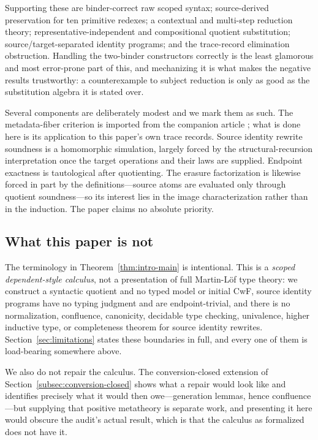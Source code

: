 \documentclass[10pt,reqno]{amsart}
\begin{document}
Supporting these are binder-correct raw scoped syntax; source-derived
preservation for ten primitive redexes; a contextual and multi-step reduction
theory; representative-independent and compositional quotient substitution;
source/target-separated identity programs; and the trace-record elimination
obstruction.  Handling the two-binder constructors correctly is the least
glamorous and most error-prone part of this, and mechanizing it is what makes
the negative results trustworthy: a counterexample to subject reduction is only
as good as the substitution algebra it is stated over.

Several components are deliberately modest and we mark them as such.  The
metadata-fiber criterion is imported from the companion article
\cite{ObservableMetadata2026}; what is done here is its application to this
paper's own trace records.  Source identity rewrite soundness is a homomorphic
simulation, largely forced by the structural-recursion interpretation once the
target operations and their laws are supplied.  Endpoint exactness is
tautological after quotienting.  The erasure factorization is likewise forced
in part by the definitions---source atoms are evaluated only through quotient
soundness---so its interest lies in the image characterization rather than in
the induction.  The paper claims no absolute priority.

\subsection*{What this paper is not}

The terminology in Theorem~\ref{thm:intro-main} is intentional.  This is a
\emph{scoped dependent-style calculus}, not a presentation of full
Martin-L\"of type theory: we construct a syntactic quotient and no typed model
or initial CwF, source identity programs have no typing judgment and are
endpoint-trivial, and there is no normalization, confluence, canonicity,
decidable type checking, univalence, higher inductive type, or completeness
theorem for source identity rewrites.  Section~\ref{sec:limitations} states
these boundaries in full, and every one of them is load-bearing somewhere
above.

We also do not repair the calculus.  The conversion-closed extension of
Section~\ref{subsec:conversion-closed} shows what a repair would look like and
identifies precisely what it would then owe---generation lemmas, hence
confluence---but supplying that positive metatheory is separate work, and
presenting it here would obscure the audit's actual result, which is that the
calculus as formalized does not have it.
\end{document}

